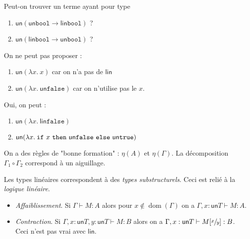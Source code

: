 \documentclass[./main]{subfiles}
\begin{document}
  \begin{exo}
    Peut-on trouver un terme ayant pour type 
    \begin{enumerate}
      \item $\mathsf{un}(\mathsf{un} \mathtt{bool} \to \mathsf{lin} \mathtt{bool})$ ?
      \item $\mathsf{un}(\mathsf{lin} \mathtt{bool} \to \mathsf{un} \mathtt{bool})$ ?
    \end{enumerate}

    On ne peut pas proposer :
    \begin{enumerate}
      \item $\mathsf{un}(\lambda x. \: x)$ car on n'a pas de $\mathsf{lin}$
      \item $\mathsf{un}(\lambda x. \: \mathsf{un} \mathtt{false})$ car on n'utilise pas le $x$.
    \end{enumerate}

    Oui, on peut :
    \begin{enumerate}
      \item $\mathsf{un}(\lambda x. \: \mathsf{lin} \mathtt{false})$ 
      \item $\mathsf{un}(\lambda x. \: \texttt{if}\ x\ \texttt{then}\ \mathsf{un} \texttt{false}\ \texttt{else}\ {\mathsf{un} \texttt{true}})$ 
    \end{enumerate}
  \end{exo}

  \begin{rmk}
    On a des règles de "bonne formation" : $\eta(A)$ et  $\eta(\Gamma)$.
    La décomposition  $\Gamma_1 \circ \Gamma_2$ correspond à un aiguillage.

    Les types linéaires correspondent à des \textit{types substructurels}.
    Ceci est relié à la \textit{logique linéaire}.
  \end{rmk}

  \begin{lem}
    \begin{itemize}
      \item \textit{Affaiblissement}. Si $\Gamma \vdash M : A$ alors pour $x \not\in \operatorname{dom}(\Gamma)$ on a $\Gamma, x : \mathsf{un}T \vdash M : A$.
      \item \textit{Contraction}. Si $\Gamma, x : \mathsf{un}T, y : \mathsf{un}T \vdash M : B$ alors on a $\Gamma, x : \mathsf{un}T \vdash M[\sfrac{x}{y}] : B$.
        Ceci n'est pas vrai avec $\mathsf{lin}$.
    \end{itemize}
  \end{lem}
\end{document}

